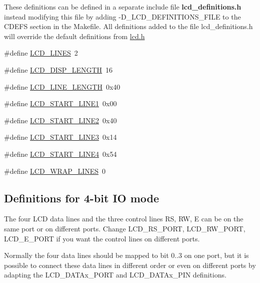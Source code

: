 These definitions can be defined in a separate include file {\bfseries{lcd\+\_\+definitions.\+h}} instead modifying this file by adding -\/D\+\_\+\+L\+C\+D\+\_\+\+D\+E\+F\+I\+N\+I\+T\+I\+O\+N\+S\+\_\+\+F\+I\+LE to the C\+D\+E\+FS section in the Makefile. All definitions added to the file lcd\+\_\+definitions.\+h will override the default definitions from \mbox{\hyperlink{lcd_8h}{lcd.\+h}} \begin{DoxyCompactItemize}
\item 
\#define \mbox{\hyperlink{group__pfleury__lcd_ga01212e90283511562039db786f65ba98}{L\+C\+D\+\_\+\+L\+I\+N\+ES}}~2
\item 
\#define \mbox{\hyperlink{group__pfleury__lcd_ga684bb4392e384b7ae7c660d81dacb930}{L\+C\+D\+\_\+\+D\+I\+S\+P\+\_\+\+L\+E\+N\+G\+TH}}~16
\item 
\#define \mbox{\hyperlink{group__pfleury__lcd_gae59a728d9dee9f12c817b29d38746ed9}{L\+C\+D\+\_\+\+L\+I\+N\+E\+\_\+\+L\+E\+N\+G\+TH}}~0x40
\item 
\#define \mbox{\hyperlink{group__pfleury__lcd_gabd056d70a1488ea2eb1aef87e248e234}{L\+C\+D\+\_\+\+S\+T\+A\+R\+T\+\_\+\+L\+I\+N\+E1}}~0x00
\item 
\#define \mbox{\hyperlink{group__pfleury__lcd_ga7b317b21058ef031716ba040ef75430a}{L\+C\+D\+\_\+\+S\+T\+A\+R\+T\+\_\+\+L\+I\+N\+E2}}~0x40
\item 
\#define \mbox{\hyperlink{group__pfleury__lcd_gae7cca16353048a062baeb3a52da55249}{L\+C\+D\+\_\+\+S\+T\+A\+R\+T\+\_\+\+L\+I\+N\+E3}}~0x14
\item 
\#define \mbox{\hyperlink{group__pfleury__lcd_gab1b73e05bdb5cc12cdff5a1cf6c4f2a2}{L\+C\+D\+\_\+\+S\+T\+A\+R\+T\+\_\+\+L\+I\+N\+E4}}~0x54
\item 
\#define \mbox{\hyperlink{group__pfleury__lcd_gadb35ff6cb242e48ba0545ea919ffc5d3}{L\+C\+D\+\_\+\+W\+R\+A\+P\+\_\+\+L\+I\+N\+ES}}~0
\end{DoxyCompactItemize}
\subsection*{Definitions for 4-\/bit IO mode}
\label{_amgrp0d38ed8c5b4202f593f69f9003c1a16c}%
The four L\+CD data lines and the three control lines RS, RW, E can be on the same port or on different ports. Change L\+C\+D\+\_\+\+R\+S\+\_\+\+P\+O\+RT, L\+C\+D\+\_\+\+R\+W\+\_\+\+P\+O\+RT, L\+C\+D\+\_\+\+E\+\_\+\+P\+O\+RT if you want the control lines on different ports.

Normally the four data lines should be mapped to bit 0..3 on one port, but it is possible to connect these data lines in different order or even on different ports by adapting the L\+C\+D\+\_\+\+D\+A\+T\+Ax\+\_\+\+P\+O\+RT and L\+C\+D\+\_\+\+D\+A\+T\+Ax\+\_\+\+P\+IN definitions.

